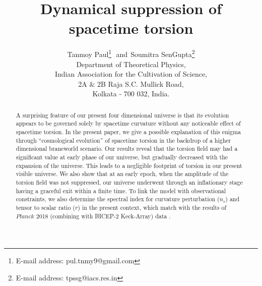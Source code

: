 \documentclass[a4paper]{article}
\title{\large \bf Dynamical suppression of spacetime torsion}
\author{Tanmoy Paul\footnote{E-mail address: pul.tnmy9@gmail.com}$~~~$and$~~$Soumitra SenGupta\footnote{E-mail address: tpssg@iacs.res.in}\\
Department of Theoretical Physics,\\
Indian Association for the Cultivation of Science,\\
2A $\&$ 2B Raja S.C. Mullick Road,\\
Kolkata - 700 032, India.\\[10mm]}
\date{}
\begin{document}
\maketitle

\begin{abstract}
A surprising feature of our present four dimensional universe is that its evolution appears to be governed solely by spacetime curvature without 
any noticeable effect of spacetime torsion. 
In the present paper, we give a possible explanation of this enigma through ``cosmological evolution'' of spacetime torsion 
in the backdrop of a higher dimensional braneworld scenario. Our results reveal that the torsion field may had a significant value 
at early phase of our universe, but gradually decreased with the expansion of the universe. This leads to a negligible 
footprint of torsion in our present visible universe. We also show that at an early epoch, when the amplitude of the torsion field was not suppressed, 
our universe underwent through an inflationary stage having a graceful exit within a finite time. 
To link the model with observational constraints, we also determine the spectral index for curvature perturbation ($n_s$) and 
tensor to scalar ratio ($r$) in the present context, which match with the results of $Planck$ 2018 (combining with BICEP-2 Keck-Array) data \cite{Planck}.
\end{abstract}
\newpage
\end{document}
